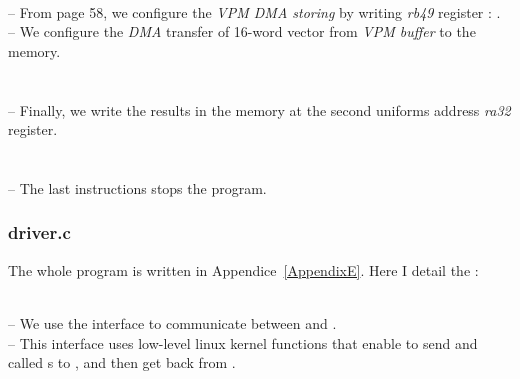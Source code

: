 \newpage
{}\\
-- From \parencite{refVC} page 58, we configure the \emph{VPM DMA storing} by writing \emph{rb49} register : .\\
-- We configure the \emph{DMA} transfer of 16-word vector from \emph{VPM buffer} to the \ram{} memory.\\

\\
\\
-- Finally, we write the results in the \ram{} memory at the second uniforms address \emph{ra32} register.\\

\\
\\
-- The last instructions stops the program.


\subsubsection{driver.c}\label{helloworldlabel}

The whole  program is written in Appendice~\ref{AppendixE}. Here I detail the :

\\
-- We use the \mail{} interface to communicate between \vc{} and \cpu.\\
-- This interface uses low-level linux kernel functions that enable  to send  and  called \uni{}s to , and then get back  from .\\


